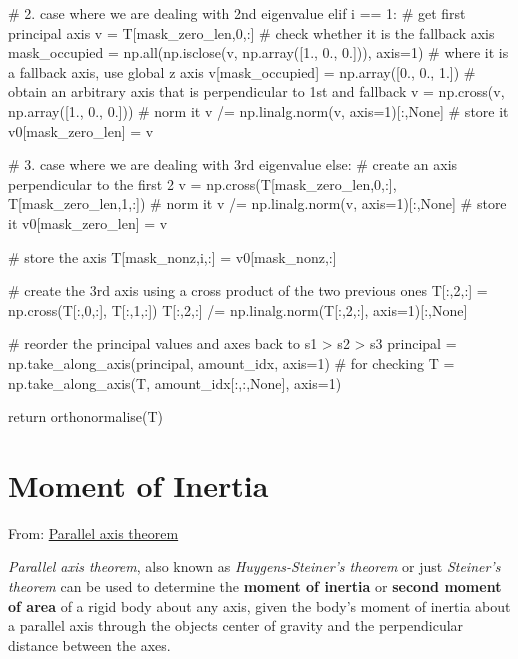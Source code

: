 \begin{itemize}
\begin{python}
        # 2. case where we are dealing with 2nd eigenvalue
        elif i == 1:
            # get first principal axis
            v = T[mask_zero_len,0,:]
            # check whether it is the fallback axis
            mask_occupied = np.all(np.isclose(v, np.array([1., 0., 0.])), axis=1)
            # where it is a fallback axis, use global z axis
            v[mask_occupied] = np.array([0., 0., 1.])
            # obtain an arbitrary axis that is perpendicular to 1st and fallback
            v = np.cross(v, np.array([1., 0., 0.]))
            # norm it
            v /= np.linalg.norm(v, axis=1)[:,None]
            # store it
            v0[mask_zero_len] = v

        # 3. case where we are dealing with 3rd eigenvalue
        else:
            # create an axis perpendicular to the first 2
            v = np.cross(T[mask_zero_len,0,:], T[mask_zero_len,1,:])
            # norm it
            v /= np.linalg.norm(v, axis=1)[:,None]
            # store it
            v0[mask_zero_len] = v

        # store the axis
        T[mask_nonz,i,:] = v0[mask_nonz,:]

    # create the 3rd axis using a cross product of the two previous ones
    T[:,2,:] = np.cross(T[:,0,:], T[:,1,:])
    T[:,2,:] /= np.linalg.norm(T[:,2,:], axis=1)[:,None]


    # reorder the principal values and axes back to s1 > s2 > s3
    principal = np.take_along_axis(principal, amount_idx, axis=1) # for checking
    T = np.take_along_axis(T, amount_idx[:,:,None], axis=1)

    return orthonormalise(T)
        \end{python}



\end{itemize}


\section{Moment of Inertia}

From: \href{https://en.wikipedia.org/wiki/Parallel_axis_theorem}{Parallel axis theorem}

\textit{Parallel axis theorem}, also known as \textit{Huygens-Steiner's theorem}
or just \textit{Steiner's theorem} can be used to determine the \textbf{moment of inertia}
or \textbf{second moment of area} of a rigid body about any axis, given the body's
moment of inertia about a parallel axis through the objects center of gravity
and the perpendicular distance between the axes.

